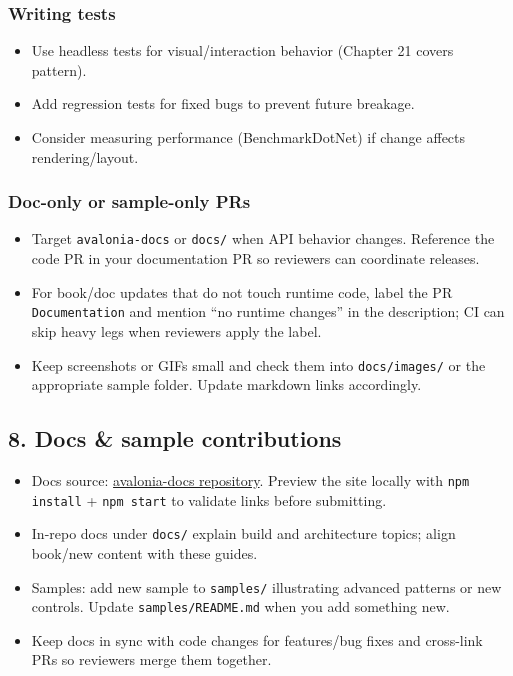 \subsubsection{Writing tests}\label{writing-tests}

\begin{itemize}
\tightlist
\item
  Use headless tests for visual/interaction behavior (Chapter 21 covers
  pattern).
\item
  Add regression tests for fixed bugs to prevent future breakage.
\item
  Consider measuring performance (BenchmarkDotNet) if change affects
  rendering/layout.
\end{itemize}

\subsubsection{Doc-only or sample-only
PRs}\label{doc-only-or-sample-only-prs}

\begin{itemize}
\tightlist
\item
  Target \passthrough{\lstinline!avalonia-docs!} or
  \passthrough{\lstinline!docs/!} when API behavior changes. Reference
  the code PR in your documentation PR so reviewers can coordinate
  releases.
\item
  For book/doc updates that do not touch runtime code, label the PR
  \passthrough{\lstinline!Documentation!} and mention ``no runtime
  changes'' in the description; CI can skip heavy legs when reviewers
  apply the label.
\item
  Keep screenshots or GIFs small and check them into
  \passthrough{\lstinline!docs/images/!} or the appropriate sample
  folder. Update markdown links accordingly.
\end{itemize}

\subsection{8. Docs \& sample
contributions}\label{docs-sample-contributions}

\begin{itemize}
\tightlist
\item
  Docs source:
  \href{https://github.com/AvaloniaUI/avalonia-docs}{avalonia-docs
  repository}. Preview the site locally with
  \passthrough{\lstinline!npm install!} +
  \passthrough{\lstinline!npm start!} to validate links before
  submitting.
\item
  In-repo docs under \passthrough{\lstinline!docs/!} explain build and
  architecture topics; align book/new content with these guides.
\item
  Samples: add new sample to \passthrough{\lstinline!samples/!}
  illustrating advanced patterns or new controls. Update
  \passthrough{\lstinline!samples/README.md!} when you add something
  new.
\item
  Keep docs in sync with code changes for features/bug fixes and
  cross-link PRs so reviewers merge them together.
\end{itemize}

